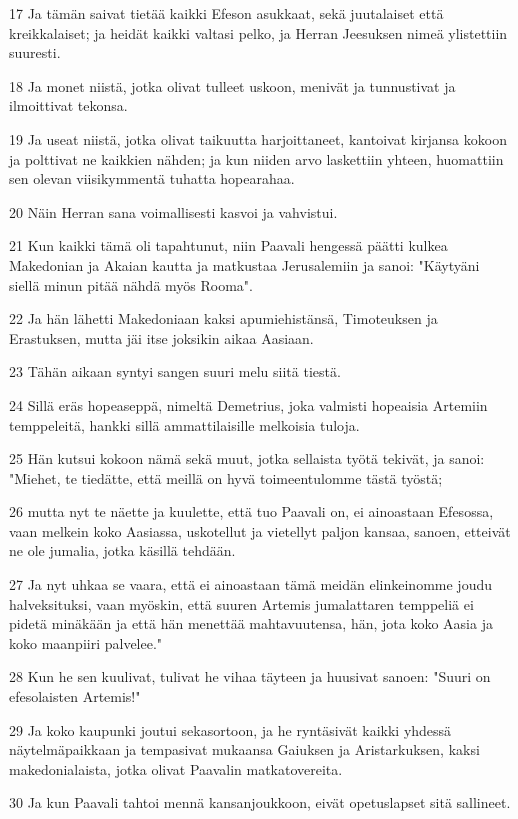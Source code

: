 \par 17 Ja tämän saivat tietää kaikki Efeson asukkaat, sekä juutalaiset että kreikkalaiset; ja heidät kaikki valtasi pelko, ja Herran Jeesuksen nimeä ylistettiin suuresti.
\par 18 Ja monet niistä, jotka olivat tulleet uskoon, menivät ja tunnustivat ja ilmoittivat tekonsa.
\par 19 Ja useat niistä, jotka olivat taikuutta harjoittaneet, kantoivat kirjansa kokoon ja polttivat ne kaikkien nähden; ja kun niiden arvo laskettiin yhteen, huomattiin sen olevan viisikymmentä tuhatta hopearahaa.
\par 20 Näin Herran sana voimallisesti kasvoi ja vahvistui.
\par 21 Kun kaikki tämä oli tapahtunut, niin Paavali hengessä päätti kulkea Makedonian ja Akaian kautta ja matkustaa Jerusalemiin ja sanoi: "Käytyäni siellä minun pitää nähdä myös Rooma".
\par 22 Ja hän lähetti Makedoniaan kaksi apumiehistänsä, Timoteuksen ja Erastuksen, mutta jäi itse joksikin aikaa Aasiaan.
\par 23 Tähän aikaan syntyi sangen suuri melu siitä tiestä.
\par 24 Sillä eräs hopeaseppä, nimeltä Demetrius, joka valmisti hopeaisia Artemiin temppeleitä, hankki sillä ammattilaisille melkoisia tuloja.
\par 25 Hän kutsui kokoon nämä sekä muut, jotka sellaista työtä tekivät, ja sanoi: "Miehet, te tiedätte, että meillä on hyvä toimeentulomme tästä työstä;
\par 26 mutta nyt te näette ja kuulette, että tuo Paavali on, ei ainoastaan Efesossa, vaan melkein koko Aasiassa, uskotellut ja vietellyt paljon kansaa, sanoen, etteivät ne ole jumalia, jotka käsillä tehdään.
\par 27 Ja nyt uhkaa se vaara, että ei ainoastaan tämä meidän elinkeinomme joudu halveksituksi, vaan myöskin, että suuren Artemis jumalattaren temppeliä ei pidetä minäkään ja että hän menettää mahtavuutensa, hän, jota koko Aasia ja koko maanpiiri palvelee."
\par 28 Kun he sen kuulivat, tulivat he vihaa täyteen ja huusivat sanoen: "Suuri on efesolaisten Artemis!"
\par 29 Ja koko kaupunki joutui sekasortoon, ja he ryntäsivät kaikki yhdessä näytelmäpaikkaan ja tempasivat mukaansa Gaiuksen ja Aristarkuksen, kaksi makedonialaista, jotka olivat Paavalin matkatovereita.
\par 30 Ja kun Paavali tahtoi mennä kansanjoukkoon, eivät opetuslapset sitä sallineet.
